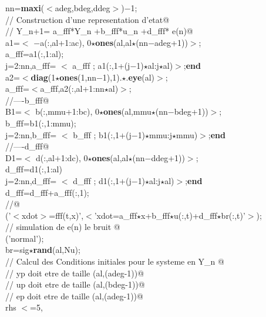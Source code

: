 {\begin{flushleft}
{\cmarg nn={\bf maxi}($<$adeg,bdeg,ddeg$>$)$-$1;\\ 
\cmarg \verb@// Construction d'une representation d'etat@\\ 
\cmarg \verb@// Y\_{n+1}= a\_fff*Y\_{n}  +b\_fff*u\_n +d\_fff* e(n)@\\ 
\cmarg a1=$<$ $-$a(:,al+1:ac), 0$\star${\bf ones}(al,al$\star$(nn$-$adeg+1))$>$;\\ 
\cmarg a\_fff=a1(:,1:al);\\ 
 j=2:nn,a\_fff= $<$ a\_fff ; a1(:,1+(j$-$1)$\star$al:j$\star$al)$>$;{\bf end}\\ 
\cmarg a2=$<${\bf diag}(1$\star${\bf ones}(1,nn$-$1),1).$\star$.{\bf eye}(al)$>$;\\ 
\cmarg a\_fff=$<$a\_fff,a2(:,al+1:nn$\star$al)$>$;\\ 
\cmarg \verb@//----b\_fff@\\ 
\cmarg B1=$<$ b(:,mmu+1:bc), 0$\star${\bf ones}(al,mmu$\star$(nn$-$bdeg+1))$>$;\\ 
\cmarg b\_fff=b1(:,1:mmu);\\ 
 j=2:nn,b\_fff= $<$ b\_fff ; b1(:,1+(j$-$1)$\star$mmu:j$\star$mmu)$>$;{\bf end}\\ 
\cmarg \verb@//----d\_fff@\\ 
\cmarg D1=$<$ d(:,al+1:dc), 0$\star${\bf ones}(al,al$\star$(nn$-$ddeg+1))$>$;\\ 
\cmarg d\_fff=d1(:,1:al)\\ 
 j=2:nn,d\_fff= $<$ d\_fff ; d1(:,1+(j$-$1)$\star$al:j$\star$al)$>$;{\bf end}\\ 
\cmarg d\_fff=d\_fff+a\_fff(:,1);\\ 
\cmarg \verb@//@\\ 
('$<$xdot$>$=fff(t,x)',$<$'xdot=a\_fff$\star$x+b\_fff$\star$u(:,t)+d\_fff$\star$br(:,t)'$>$);\\ 
\cmarg \verb@// simulation de e(n) le bruit @\\ 
('normal');\\ 
\cmarg br=sig$\star${\bf rand}(al,Nu);\\ 
\cmarg \verb@// Calcul des Conditions initiales pour le systeme en Y\_n @\\ 
\cmarg \verb@// yp doit etre de taille (al,(adeg-1))@\\ 
\cmarg \verb@// up doit etre de taille (al,(bdeg-1))@\\ 
\cmarg \verb@// ep doit etre de taille (al,(adeg-1))@\\ 
 rhs $<$=5,\\ 
}
\end{flushleft}}
